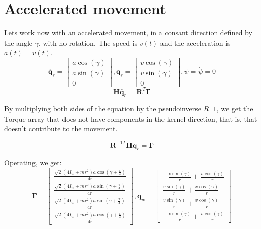 \documentclass[12pt]{article}
\renewcommand{\vec}[1]{\bm{#1}}
\newcommand{\R}{\mathbb R}
\def\Torque{\vec \Gamma}
\def\R{\vec R}
\def\q{\vec q}
\begin{document}
\section*{Accelerated movement}

Lets work now with an accelerated movement, in a consant direction defined by the angle $\gamma$, with no rotation. The speed is $v(t)$ and the acceleration is $a(t) = \dot{v}(t)$.
$$\ddot{\q_r} = \left[\begin{matrix}a \operatorname{cos}\left(\gamma\right)\\a \operatorname{sin}\left(\gamma\right)\\0\end{matrix}\right],
\dot{\q_r} =  \left[\begin{matrix}v \operatorname{cos}\left(\gamma\right)\\v \operatorname{sin}\left(\gamma\right)\\0\end{matrix}\right], \psi = \dot{\psi} = 0$$
$$\vec H \ddot{\q_r} = \R^T \Torque$$

By multiplying both sides of the equation by the pseudoinverse $R^-1$, we get the Torque array that does not have components in the kernel direction, that is, that doesn't contribute to the movement.

$$ \R^{-1T} \vec H \ddot{\q_r} =\Torque$$

Operating, we get: 
$$\Torque = \left[\begin{matrix}\frac{\sqrt{2} \left(4 I_{w} + m r^{2}\right) a \operatorname{cos}\left(\gamma + \frac{\pi}{4}\right)}{4 r}\\\frac{\sqrt{2} \left(4 I_{w} + m r^{2}\right) a \operatorname{sin}\left(\gamma + \frac{\pi}{4}\right)}{4 r}\\\frac{\sqrt{2} \left(4 I_{w} + m r^{2}\right) a \operatorname{sin}\left(\gamma + \frac{\pi}{4}\right)}{4 r}\\\frac{\sqrt{2} \left(4 I_{w} + m r^{2}\right) a \operatorname{cos}\left(\gamma + \frac{\pi}{4}\right)}{4 r}\end{matrix}\right] ,
 \dot{\q_w} =  \left[\begin{matrix}- \frac{v \operatorname{sin}\left(\gamma\right)}{r} + \frac{v \operatorname{cos}\left(\gamma\right)}{r}\\\frac{v \operatorname{sin}\left(\gamma\right)}{r} + \frac{v \operatorname{cos}\left(\gamma\right)}{r}\\\frac{v \operatorname{sin}\left(\gamma\right)}{r} + \frac{v \operatorname{cos}\left(\gamma\right)}{r}\\- \frac{v \operatorname{sin}\left(\gamma\right)}{r} + \frac{v \operatorname{cos}\left(\gamma\right)}{r}\end{matrix}\right]$$
\end{document}
